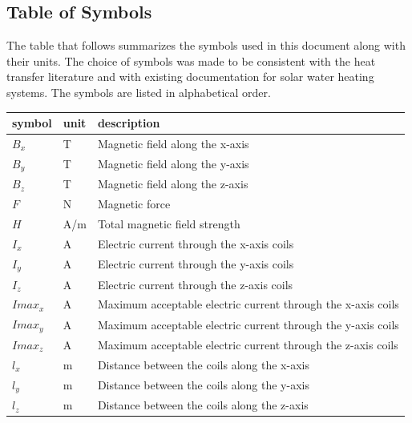 \documentclass[12pt]{article}
\begin{document}
\subsection{Table of Symbols}

The table that follows summarizes the symbols used in this document along with
their units.  The choice of symbols was made to be consistent with the heat
transfer literature and with existing documentation for solar water heating
systems.  The symbols are listed in alphabetical order.

\renewcommand{\arraystretch}{1.2}
\noindent \begin{longtable*}{l l p{12cm}} \toprule
\textbf{symbol} & \textbf{unit} & \textbf{description}\\
\midrule 
$B_x$ & \si[per-mode=symbol]{\tesla} & Magnetic field along the x-axis \\
$B_y$ & \si[per-mode=symbol]{\tesla} & Magnetic field along the y-axis \\
$B_z$ & \si[per-mode=symbol]{\tesla} & Magnetic field along the z-axis \\
$F$ & \si[per-mode=symbol]{\newton} & Magnetic force \\
$H$ & \si[per-mode=symbol]{\ampere\per\metre} & Total magnetic field strength \\
$I_x$ & \si[per-mode=symbol]{\ampere} & Electric current through the x-axis coils \\
$I_y$ & \si[per-mode=symbol]{\ampere} & Electric current through the y-axis coils \\
$I_z$ & \si[per-mode=symbol]{\ampere} & Electric current through the z-axis coils \\
$Imax_x$ & \si[per-mode=symbol]{\ampere} & Maximum acceptable electric current through the x-axis coils \\
$Imax_y$ & \si[per-mode=symbol]{\ampere} & Maximum acceptable electric current through the y-axis coils \\
$Imax_z$ & \si[per-mode=symbol]{\ampere} & Maximum acceptable electric current through the z-axis coils \\
$l_x$ & \si[per-mode=symbol]{\metre} & Distance between the coils along the x-axis \\
$l_y$ & \si[per-mode=symbol]{\metre} & Distance between the coils along the y-axis \\
$l_z$ & \si[per-mode=symbol]{\metre} & Distance between the coils along the z-axis \\

\end{longtable*}
\end{document}
